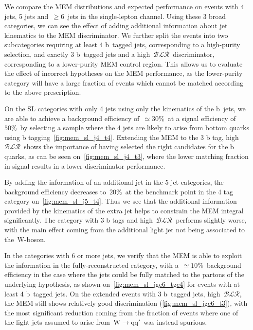 We compare the MEM distributions and expected performance on events with 4 jets, 5 jets and~$\ge6$~jets in the single-lepton channel. Using these 3 broad categories, we can see the effect of adding additional information about jet kinematics to the MEM discriminator. We further split the events into two subcategories requiring at least 4 b~tagged jets, corresponding to a high-purity selection, and exactly 3 b~tagged jets and a high~$\mathcal{BLR}$~discriminator, corresponding to a lower-purity MEM control region. This allows us to evaluate the effect of incorrect hypotheses on the MEM performance, as the lower-purity category will have a large fraction of events which cannot be matched according to the above prescription. 

On the SL categories with only 4 jets using only the kinematics of the b~jets, we are able to achieve a background efficiency of~$\simeq 30\%$~at a signal efficiency of~$50\%$~by selecting a sample where the 4 jets are likely to arise from bottom quarks using b tagging~\cref{fig:mem_sl_j4_t4}. Extending the MEM to the 3 b tag, high~$\mathcal{BLR}$~shows the importance of having selected the right candidates for the b quarks, as can be seen on~\cref{fig:mem_sl_j4_t3}, where the lower matching fraction in signal results in a lower discriminator performance.

By adding the information of an additional jet in the 5 jet categories, the background efficiency decreases to~$20\%$~at the benchmark point in the 4 tag category on~\cref{fig:mem_sl_j5_t4}. Thus we see that the additional information provided by the kinematics of the extra jet helps to constrain the MEM integral significantly. The category with 3 b tags and high~$\mathcal{BLR}$~performs slightly worse, with the main effect coming from the additional light jet not being associated to the~$\mathrm{W}$-boson.

In the categories with 6 or more jets, we verify that the MEM is able to exploit the information in the fully-reconstructed category, with a~$\simeq 10\%$~background efficiency in the case where the jets could be fully matched to the partons of the underlying hypothesis, as shown on~\cref{fig:mem_sl_jge6_tge4} for events with at least 4 b~tagged jets. On the extended events with 3 b~tagged jets, high~$\mathcal{BLR}$, the MEM still shows relatively good discrimination (\cref{fig:mem_sl_jge6_t3}), with the most significant reduction coming from the fraction of events where one of the light jets assumed to arise from~$\mathrm{W} \rightarrow \mathrm{q} \mathrm{q}'$~was instead spurious.

